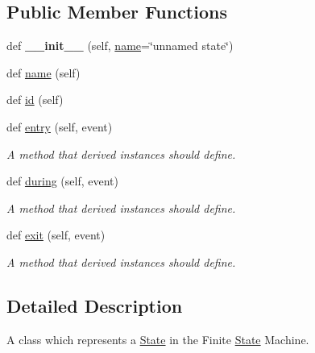 \subsection*{Public Member Functions}
\begin{DoxyCompactItemize}
\item 
\mbox{\label{classelma_1_1api_1_1state_1_1State_a527faccc6a4e00fff27b66ac685a2dbb}} 
def {\bfseries \+\_\+\+\_\+init\+\_\+\+\_\+} (self, \hyperlink{classelma_1_1api_1_1state_1_1State_af557d974acb64b3cd0b6bc687bb1658a}{name}=\char`\"{}unnamed state\char`\"{})
\item 
def \hyperlink{classelma_1_1api_1_1state_1_1State_af557d974acb64b3cd0b6bc687bb1658a}{name} (self)
\item 
def \hyperlink{classelma_1_1api_1_1state_1_1State_aad456a6f35fb49f1e1702eac0954ed2c}{id} (self)
\item 
def \hyperlink{classelma_1_1api_1_1state_1_1State_a9faa0f15ba6f380e9815554cdbfd586d}{entry} (self, event)
\begin{DoxyCompactList}\small\item\em A method that derived instances should define. \end{DoxyCompactList}\item 
def \hyperlink{classelma_1_1api_1_1state_1_1State_a67235fad4e69aa8c21ec26eae249e01d}{during} (self, event)
\begin{DoxyCompactList}\small\item\em A method that derived instances should define. \end{DoxyCompactList}\item 
def \hyperlink{classelma_1_1api_1_1state_1_1State_ad57604af6fe62f311bc073cf027ea552}{exit} (self, event)
\begin{DoxyCompactList}\small\item\em A method that derived instances should define. \end{DoxyCompactList}\end{DoxyCompactItemize}


\subsection{Detailed Description}
A class which represents a \hyperlink{classelma_1_1api_1_1state_1_1State}{State} in the Finite \hyperlink{classelma_1_1api_1_1state_1_1State}{State} Machine. 



